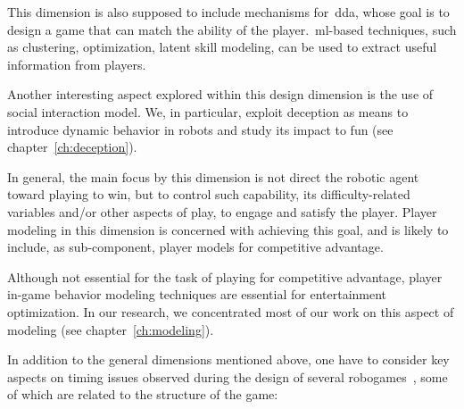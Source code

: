 \begin{itemize}[leftmargin=*,labelsep=5.8mm]
This dimension is also supposed to include mechanisms for~\gls{dda}, whose goal is to design a game that can match the ability of the player.~\gls{ml}-based techniques, such as clustering, optimization, latent skill modeling, can be used to extract useful information from players. 

Another interesting aspect explored within this design dimension is the use of social interaction model. We, in particular, exploit deception as means to introduce dynamic behavior in robots and study its impact to fun (see chapter~\ref{ch:deception}).

In general, the main focus by this dimension is not direct the robotic agent toward playing to win, but to control such capability, \eg its difficulty-related variables and/or other aspects of play, to engage and satisfy the player. Player modeling in this dimension is concerned with achieving this goal, and is likely to include, as sub-component, player models for competitive advantage.
\end{itemize}

Although not essential for the task of playing for competitive advantage, player in-game behavior modeling techniques are essential for entertainment optimization. In our research, we concentrated most of our work on this aspect of modeling (see chapter~\ref{ch:modeling}).

In addition to the general dimensions mentioned above, one have to consider key aspects on timing issues observed during the design of several robogames~\cite{bonarini_timing_2014}, some of which are related to the structure of the game:

